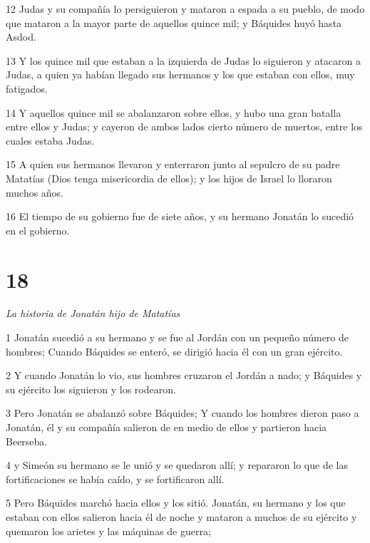 \par 12 Judas y su compañía lo persiguieron y mataron a espada a su pueblo, de modo que mataron a la mayor parte de aquellos quince mil; y Báquides huyó hasta Asdod.

\par 13 Y los quince mil que estaban a la izquierda de Judas lo siguieron y atacaron a Judas, a quien ya habían llegado sus hermanos y los que estaban con ellos, muy fatigados.

\par 14 Y aquellos quince mil se abalanzaron sobre ellos, y hubo una gran batalla entre ellos y Judas; y cayeron de ambos lados cierto número de muertos, entre los cuales estaba Judas.

\par 15 A quien sus hermanos llevaron y enterraron junto al sepulcro de su padre Matatías (Dios tenga misericordia de ellos); y los hijos de Israel lo lloraron muchos años.

\par 16 El tiempo de su gobierno fue de siete años, y su hermano Jonatán lo sucedió en el gobierno.

\chapter{18}

\par \textit{La historia de Jonatán hijo de Matatías}

\par 1 Jonatán sucedió a su hermano y se fue al Jordán con un pequeño número de hombres; Cuando Báquides se enteró, se dirigió hacia él con un gran ejército.

\par 2 Y cuando Jonatán lo vio, sus hombres cruzaron el Jordán a nado; y Báquides y su ejército los siguieron y los rodearon.

\par 3 Pero Jonatán se abalanzó sobre Báquides; Y cuando los hombres dieron paso a Jonatán, él y su compañía salieron de en medio de ellos y partieron hacia Beerseba.

\par 4 y Simeón su hermano se le unió y se quedaron allí; y repararon lo que de las fortificaciones se había caído, y se fortificaron allí.

\par 5 Pero Báquides marchó hacia ellos y los sitió. Jonatán, su hermano y los que estaban con ellos salieron hacia él de noche y mataron a muchos de su ejército y quemaron los arietes y las máquinas de guerra;

